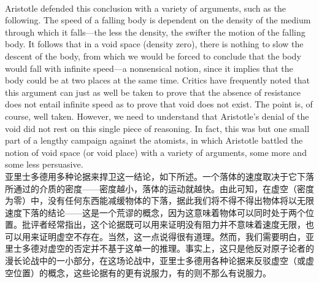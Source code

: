 \documentclass{article}
\begin{document}
\\
Aristotle defended this conclusion with a variety of arguments, such as the following. The speed of a falling body is dependent on the density of the medium through which it falls—the less the density, the swifter the motion of the falling body. It follows that in a void space (density zero), there is nothing to slow the descent of the body, from which we would be forced to conclude that the body would fall with infinite speed—a nonsensical notion, since it implies that the body could be at two places at the same time. Critics have frequently noted that this argument can just as well be taken to prove that the absence of resistance does not entail infinite speed as to prove that void does not exist. The point is, of course, well taken. However, we need to understand that Aristotle’s denial of the void did not rest on this single piece of reasoning. In fact, this was but one small part of a lengthy campaign against the atomists, in which Aristotle battled the notion of void space (or void place) with a variety of arguments, some more and some less persuasive.\\
亚里士多德用多种论据来捍卫这一结论，如下所述。一个落体的速度取决于它下落所通过的介质的密度——密度越小，落体的运动就越快。由此可知，在虚空（密度为零）中，没有任何东西能减缓物体的下落，据此我们将不得不得出物体将以无限速度下落的结论——这是一个荒谬的概念，因为这意味着物体可以同时处于两个位置。批评者经常指出，这个论据既可以用来证明没有阻力并不意味着速度无限，也可以用来证明虚空不存在。当然，这一点说得很有道理。然而，我们需要明白，亚里士多德对虚空的否定并不基于这单一的推理。事实上，这只是他反对原子论者的漫长论战中的一小部分，在这场论战中，亚里士多德用各种论据来反驳虚空（或虚空位置）的概念，这些论据有的更有说服力，有的则不那么有说服力。 \\
\end{document}
